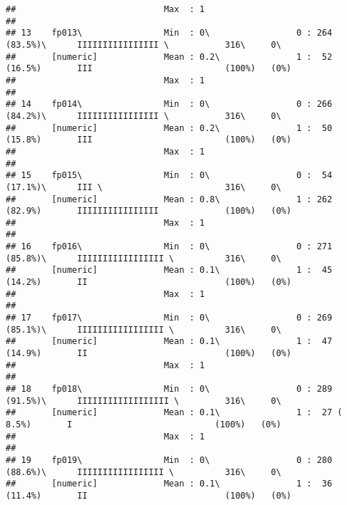 \documentclass[]{article}
\begin{document}
\begin{verbatim}
##                             Max  : 1                                                                                       
## 
## 13    fp013\                Min  : 0\                 0 : 264 (83.5%)\      IIIIIIIIIIIIIIII \           316\     0\       
##       [numeric]             Mean : 0.2\               1 :  52 (16.5%)       III                          (100%)   (0%)     
##                             Max  : 1                                                                                       
## 
## 14    fp014\                Min  : 0\                 0 : 266 (84.2%)\      IIIIIIIIIIIIIIII \           316\     0\       
##       [numeric]             Mean : 0.2\               1 :  50 (15.8%)       III                          (100%)   (0%)     
##                             Max  : 1                                                                                       
## 
## 15    fp015\                Min  : 0\                 0 :  54 (17.1%)\      III \                        316\     0\       
##       [numeric]             Mean : 0.8\               1 : 262 (82.9%)       IIIIIIIIIIIIIIII             (100%)   (0%)     
##                             Max  : 1                                                                                       
## 
## 16    fp016\                Min  : 0\                 0 : 271 (85.8%)\      IIIIIIIIIIIIIIIII \          316\     0\       
##       [numeric]             Mean : 0.1\               1 :  45 (14.2%)       II                           (100%)   (0%)     
##                             Max  : 1                                                                                       
## 
## 17    fp017\                Min  : 0\                 0 : 269 (85.1%)\      IIIIIIIIIIIIIIIII \          316\     0\       
##       [numeric]             Mean : 0.1\               1 :  47 (14.9%)       II                           (100%)   (0%)     
##                             Max  : 1                                                                                       
## 
## 18    fp018\                Min  : 0\                 0 : 289 (91.5%)\      IIIIIIIIIIIIIIIIII \         316\     0\       
##       [numeric]             Mean : 0.1\               1 :  27 ( 8.5%)       I                            (100%)   (0%)     
##                             Max  : 1                                                                                       
## 
## 19    fp019\                Min  : 0\                 0 : 280 (88.6%)\      IIIIIIIIIIIIIIIII \          316\     0\       
##       [numeric]             Mean : 0.1\               1 :  36 (11.4%)       II                           (100%)   (0%)     

\end{verbatim}
\end{document}
